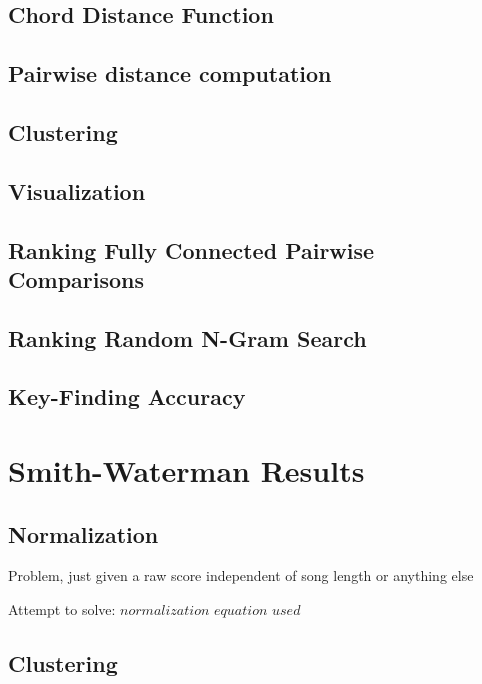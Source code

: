 \subsection{Chord Distance Function}

\subsection{Pairwise distance computation}

\subsection{Clustering}

\subsection{Visualization}

\subsection{Ranking Fully Connected Pairwise Comparisons}

\subsection{Ranking Random N-Gram Search}

\subsection{Key-Finding Accuracy}

\section{Smith-Waterman Results}

\subsection{Normalization}

\item Problem, just given a raw score independent of song length or anything else

\item Attempt to solve: $normalization$ $equation$ $used$

\subsection{Clustering}

